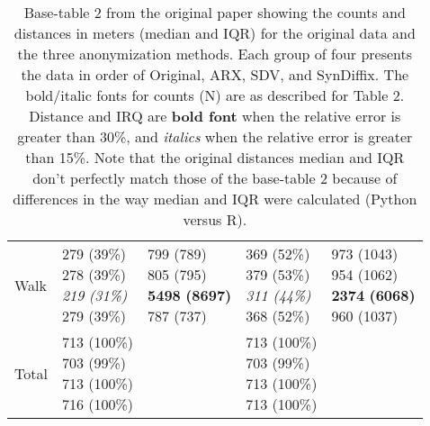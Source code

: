 \documentclass[10pt]{article}
\begin{document}
\begin{table}
\begin{center}
\begin{small}
\begin{tabular}{lllll}
Walk      &  \makecell[l]{\textnormal{279} \textnormal{(39\%)} \\\textnormal{278} \textnormal{(39\%)} \\\textit{219} \textit{(31\%)} \\\textnormal{279} \textnormal{(39\%)} \\}      &  \makecell[l]{\textnormal{799} \textnormal{(789)} \\\textnormal{805} \textnormal{(795)} \\\textbf{5498} \textbf{(8697)} \\\textnormal{787} \textnormal{(737)} \\}      &  \makecell[l]{\textnormal{369} \textnormal{(52\%)} \\\textnormal{379} \textnormal{(53\%)} \\\textit{311} \textit{(44\%)} \\\textnormal{368} \textnormal{(52\%)} \\}      &  \makecell[l]{\textnormal{973} \textnormal{(1043)} \\\textnormal{954} \textnormal{(1062)} \\\textbf{2374} \textbf{(6068)} \\\textnormal{960} \textnormal{(1037)} \\} \\ \cline{2-5}
      Total       & \makecell[l]{713 (100\%) \\703 (99\%) \\713 (100\%) \\716 (100\%) \\} &       & \makecell[l]{713 (100\%) \\703 (99\%) \\713 (100\%) \\713 (100\%) \\} & \\ 

      \bottomrule
      \end{tabular}
      \end{small}
      \caption{Base-table 2 from the original paper showing the counts and distances in meters (median and IQR) for the original data and the three anonymization methods. Each group of four presents the data in order of Original, ARX, SDV, and SynDiffix. The bold/italic fonts for counts (N) are as described for Table 2. Distance and IRQ are \textbf{bold font} when the relative error is greater than 30\%, and \textit{italics} when the relative error is greater than 15\%.  Note that the original distances median and IQR don't perfectly match those of the base-table 2 because of differences in the way median and IQR were calculated (Python versus R).}
      \label{tab:table2}
      \end{center}
      \end{table}
      \setlength{\fboxsep}{3pt}
    
\end{document}
